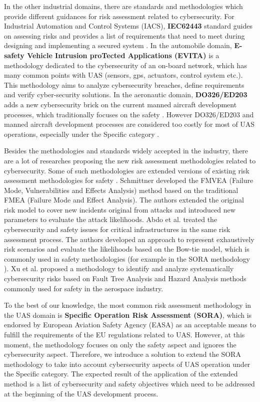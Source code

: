 \documentclass[a4paper, 10, conference]{ieeeconf}  %
\begin{document}
In the other industrial domains, there are standards and methodologies which provide different guidances for risk assessment related to cybersecurity. For Industrial Automation and Control Systems (IACS), \textbf {IEC62443} standard guides on assessing risks and provides a list of requirements that need to meet during designing and implementing a secured system \cite{CSIAC-2016}. In the automobile domain, \textbf{E-safety Vehicle Intrusion proTected Applications (EVITA)}\cite{article-EVITA_2007} \cite{evita23} is a methodology dedicated to the cybersecurity of an on-board network, which has many common points with UAS (sensors, gps, actuators, control system etc.). This methodology aims to analyze cybersecurity breaches, define requirements and verify cyber-security solutions. In the aeronautic domain, \textbf{DO326/ED203} adds a new cybersecurity brick on the current manned aircraft development processes, which traditionally focuses on the safety \cite{ED202}. However DO326/ED203 and manned aircraft development processes are considered too costly for most of UAS operations, especially under the Specific category \cite{A-NPA2015}. 

Besides the methodologies and standards widely accepted in the industry, there are a lot of researches proposing the new risk assessment methodologies related to cybersecurity. Some of such methodologies are extended versions of existing risk assessment methodologies for safety \cite{bondavalli_security_2014, abdo:tel-01829574, jonsson_integrated_1998, 7490632, kriaa_joint_nodate}. Schmittner developed the FMVEA (Failure Mode, Vulnerabilities  and  Effects Analysis) method  based on the traditional FMEA (Failure  Mode  and  Effect  Analysis)\cite{bondavalli_security_2014}. The authors extended the original risk model to cover new incidents original from attacks and introduced new parameters to evaluate the attack likelihoods. Abdo et al.\cite{abdo:tel-01829574} treated the cybersecurity and safety issues for critical infrastructures in the same risk assessment process. The authors developed an approach to represent exhaustively risk scenarios and evaluate the likelihoods based on the Bow-tie model, which is commonly used in safety methodologies (for example in the SORA methodology \cite{dlr121660}). Xu et al. \cite{7490632} proposed a methodology to identify and analyze systematically cybersecurity risks based on Fault Tree Analysis and Hazard Analysis methods commonly used for safety in the aerospace industry.

To the best of our knowledge,  the most common risk assessment methodology in the UAS domain is \textbf{Specific Operation Risk Assessment (SORA)}, which is endorsed by European Aviation Safety Agency (EASA) as an acceptable means to fulfill the requirements of the EU regulations related to UAS. However, at this moment, the methodology focuses on only the safety aspect and ignores the cybersecurity aspect\cite{SORAV1}. Therefore, we introduce a solution to extend the SORA methodology to take into account cybersecurity aspects of UAS operation under the Specific category. The expected result of the application of the extended method is a list of cybersecurity and safety objectives which need to be addressed at the beginning of the UAS development process. 
\end{document}
